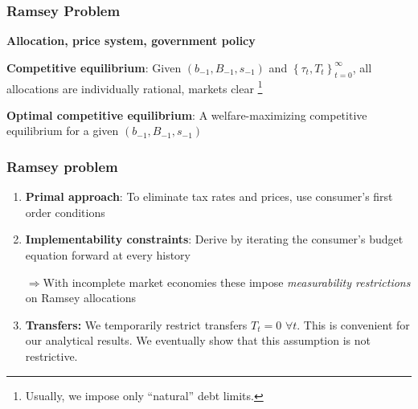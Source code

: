 \documentclass{beamer}
\begin{document}
\begin{frame}
 \frametitle{Ramsey Problem}

\begin{definition}
\textbf{Allocation, price system, government policy}

\end{definition}

\begin{definition}
\textbf{Competitive equilibrium}: Given $\left(b_{-1},B_{-1},s_{-1}\right) $ and $\left\{ \tau _{t},T_{t}\right\} _{t=0}^{\infty }$,
all allocations are individually rational, markets clear \footnote{Usually, we impose only  ``natural'' debt limits. }
\end{definition}

\begin{definition}
\textbf{Optimal competitive equilibrium}: A welfare-maximizing competitive
equilibrium for a given $\left( b_{-1},B_{-1},s_{-1}\right) $
\end{definition}

 \end{frame}

\begin{frame}
  \frametitle{Ramsey problem}
  
  \begin{enumerate}
  \item \textbf{Primal approach}: To eliminate tax rates and prices, use  consumer's first order conditions
  \item \textbf{Implementability constraints}:  Derive by iterating the consumer's budget equation forward  at every history

  $\Rightarrow$With incomplete market economies these impose  \emph{measurability restrictions} on Ramsey allocations

  \item  \textbf{Transfers: } We temporarily restrict transfers $T_t = 0$  $\forall t$. This is convenient for our analytical results.  We eventually show  that this assumption is not restrictive.

  \end{enumerate}


  \end{frame}
\end{document}
